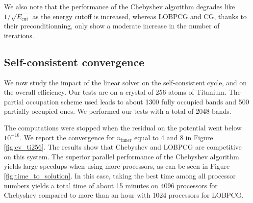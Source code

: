 \documentclass[11pt]{elsarticle}
\newcommand{\nline}{\ensuremath{n_{\text{inner}}}\xspace}
\begin{document}
We also note that the performance of the Chebyshev algorithm degrades
like $1/\sqrt{E_{\text{cut}}}$ as the energy cutoff is increased,
whereas LOBPCG and CG, thanks to their preconditionning, only show a
moderate increase in the number of iterations.



\subsection{Self-consistent convergence}
We now study the impact of the linear solver on the self-consistent cycle, and on
the overall efficiency. Our tests are on a crystal of 256 atoms of
Titanium. The partial occupation scheme used leads to about 1300 fully
occupied bands and 500 partially occupied ones. We performed our tests
with a total of 2048 bands.

The computations were stopped when the residual on the potential went
below $10^{-10}$. We report the convergence for \nline equal
to 4 and 8 in Figure \ref{fig:cv_ti256}. The results show that
Chebyshev and LOBPCG are competitive on this system. The superior
parallel performance of the Chebyshev algorithm yields large speedups
when using more processors, as can be seen in Figure
\ref{fig:time_to_solution}. In this case, taking the best time among
all processor numbers yields a total time of about 15 minutes on 4096
processors for Chebyshev compared to more than an hour with 1024
processors for LOBPCG.
\end{document}
